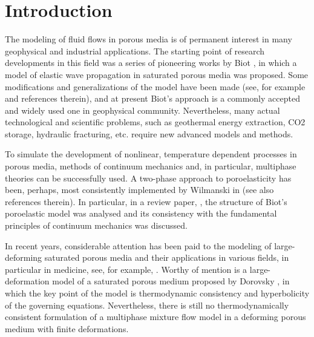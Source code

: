 \documentclass[3p,times,table]{article}
\begin{document}

% 
\section{Introduction} \label{sec:introduction}
%
The modeling of fluid flows in porous media is of permanent interest in many geophysical and 
industrial applications. The starting point of research developments in this field was a series 
of pioneering works by Biot \cite{Biot1956,Biot1956a,Biot1962}, 
in which a model of elastic wave propagation in 
saturated porous media was proposed. Some modifications and generalizations of 
the model 
have been made (see, for example 
\cite{Carcione2010,Masson2006,Winkler1989} and references therein), and at 
present Biot's approach is 
a commonly accepted and widely used one in geophysical community. Nevertheless, many actual 
technological and scientific problems, such as geothermal energy extraction, CO2 storage, hydraulic 
fracturing, etc. require new advanced models and methods. 

To simulate the development of nonlinear, temperature dependent processes in porous media, methods of continuum mechanics and, in particular, multiphase theories can be successfully used. 
A two-phase approach to poroelasticity has been, perhaps, most consistently
implemented by Wilmanski in \cite{Wilmanski1998,Wilmanski2006} (see also 
references therein). In particular, in a review paper, \cite{Wilmanski2006}, 
the structure of Biot's poroelastic model was analysed and its consistency 
with the fundamental principles of continuum mechanics was discussed. 

In recent years, considerable attention has been paid to the modeling of large-deforming saturated porous media and their applications in various fields, in particular in medicine, see,
for example, \cite{Khoei2011,Rohan2017,Pesavento2017}.
Worthy of mention is a large-deformation model of a saturated porous 
medium proposed by Dorovsky 
\cite{BlokhinDorovsky1995}, in which the key point of the model is  
thermodynamic consistency and hyperbolicity of the governing equations. 
Nevertheless, there is still no  thermodynamically consistent 
formulation of a multiphase mixture flow model in a  deforming porous medium 
with finite deformations. 
\end{document}
